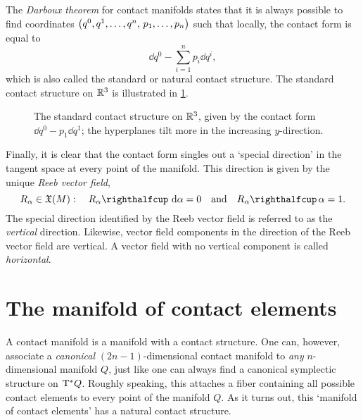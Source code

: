 The \emph{Darboux theorem} for contact manifolds states that it is always possible to find coordinates \(\qty(q^0, q^1, \ldots, q^n,\, p_1, \ldots, p_n)\) such that locally, the contact form is equal to 
\begin{equation}
     \dd{q^0} - \sum_{i=1}^n p_i\dd{q^i},
\end{equation}
which is also called the standard or natural contact structure. The standard contact structure on \(\mathbb{R}^3\) is illustrated in \cref{fig:standard_contact}.
\begin{figure}
    \centering
    
    \caption{The standard contact structure on \(\mathbb{R}^3\), given by the contact form \(\dd{q^0} - p_1\dd{q^1}\); the hyperplanes tilt more in the increasing \(y\)-direction.}
    \label{fig:standard_contact}
\end{figure}
Finally, it is clear that the contact form singles out a `special direction' in the tangent space at every point of the manifold. This direction is given by the unique \emph{Reeb vector field},
\begin{equation}
    R_\alpha \in \vfields{M}:\quad \intpr{R_\alpha}{\dd{\alpha}}= 0 \quad \text{and} \quad \intpr{R_\alpha}{\alpha} = 1. 
    \label{eq:reeb_vf}
\end{equation}
The special direction identified by the Reeb vector field is referred to as the \emph{vertical} direction. Likewise, vector field components in the direction of the Reeb vector field are vertical. A vector field with no vertical component is called \emph{horizontal}.

\section{The manifold of contact elements}
\label{ssec:mfd_contact_elements}
A contact manifold is a manifold with a contact structure. One can, however, associate a \emph{canonical} \((2n-1)\)-dimensional contact manifold to \emph{any} \(n\)-dimensional manifold \(Q\), just like one can always find a canonical symplectic structure on \(\mathrm{T}^*Q\). Roughly speaking, this attaches a fiber containing all possible contact elements to every point of the manifold \(Q\). As it turns out, this `manifold of contact elements' has a natural contact structure.

